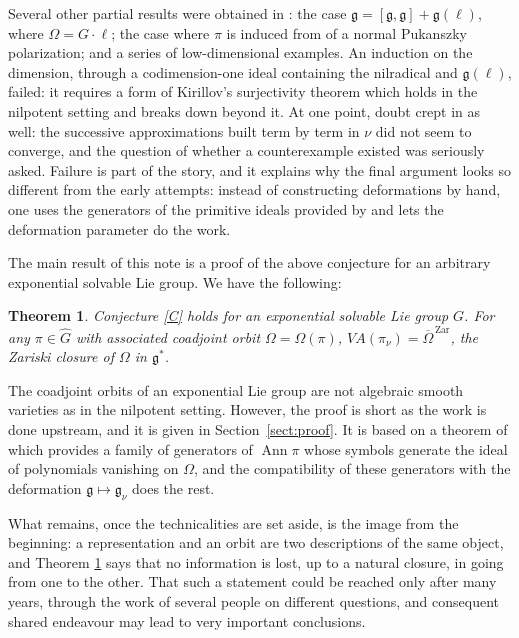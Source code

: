 \documentclass[11pt]{amsart}
\theoremstyle{plain}
\newtheorem{thm}{Theorem}[section]
\theoremstyle{definition}
\theoremstyle{remark}
\newcommand{\g}{\mathfrak g}
\newcommand{\Ann}{\operatorname{Ann}}
\newcommand{\VA}{V\!A}
\newcommand{\clos}[1]{\overline{#1}^{\,\mathrm{Zar}}}
\begin{document}
	Several other partial results were obtained in \cite{BDM19}: the case $\g=[\g,\g]+\g(\ell)$, where $\Omega=G\cdot \ell$;    the case where $\pi$ is induced from of a normal Pukanszky polarization; and a series of low-dimensional examples. An induction on the dimension, through a codimension-one ideal containing the nilradical and $\g(\ell)$, failed: it requires a form of Kirillov's surjectivity theorem which holds in the nilpotent setting and breaks down beyond it. At one point, doubt crept in as well: the successive approximations built term by term in $\nu$ did not seem to converge, and the question of whether a counterexample existed was seriously asked. Failure is part of the story, and it explains why the final argument looks so different from the early attempts: instead of constructing deformations by hand, one uses the generators of the primitive ideals provided by \cite{Bak-Fuji-Casimir} and lets the deformation parameter do the work.
	
	The main result of this note is a proof of the above conjecture for an arbitrary exponential solvable Lie group.  We have the following:
	
	
	\begin{thm}\label{main result}
		Conjecture \ref{C} holds for an exponential solvable Lie group $G$.  For any  $\pi\in\widehat G$ with associated coadjoint orbit $\Omega=\Omega(\pi)$, 
		$\VA(\pi_\nu)=\clos{\Omega}$, the Zariski closure of $\Omega$ in $\g^*$.
	\end{thm}
	
	The coadjoint orbits of an exponential Lie group are not algebraic  smooth  varieties as in the nilpotent setting. However, the proof is short as the work is done upstream, and it is given in Section~\ref{sect:proof}.  It  is based on a theorem of \cite{Bak-Fuji-Casimir} which provides a family of generators of $\Ann\pi$ whose symbols generate the ideal of polynomials vanishing on $\Omega$, and the compatibility of these generators with the deformation $\g\mapsto\g_\nu$ does the rest. 
	
	What remains, once the technicalities are set aside, is the image from the beginning: a representation and an orbit are two descriptions of the same object, and Theorem \ref{main result} says that no information is lost, up to a natural closure, in going from one to the other. That such a statement could be reached only after many years, through the work of several people on different questions, and consequent  shared endeavour may lead to very important conclusions.
	
\end{document}
